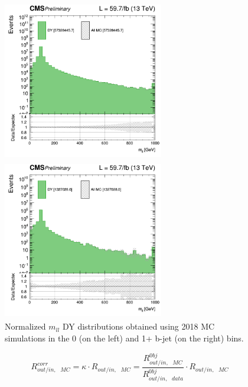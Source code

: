\documentclass[a4paper, 10pt, openright]{report}
\begin{document}
\begin{figure}[htbp]
\begin{center}
\begin{minipage}[b]{.48\textwidth}
\includegraphics[width=7cm, height=7cm]{figs/log_cratio_0bjet_mll.png}
\end{minipage} \hfill
\begin{minipage}[b]{.48\textwidth}
\includegraphics[width=7cm, height=7cm]{figs/log_cratio_1bjetOrMore_mll.png}
\end{minipage} \hfill
\caption{Normalized $m_{ll}$ \ac{DY} distributions obtained using 2018 \ac{MC} simulations in the 0 (on the left) and 1+ b-jet (on the right) bins.}
\label{fig:Rinoutver}
\end{center}
\end{figure}

\begin{equation}
\label{eq:genRinout}
R_{out/in,\text{ } MC}^{corr} = \kappa \cdot R_{out/in,\text{ } MC} = \frac{R_{out/in,\text{ } MC}^{0bj}}{R_{out/in,\text{ } data}^{0bj}} \cdot R_{out/in,\text{ } MC}
\end{equation}	

\end{document}
